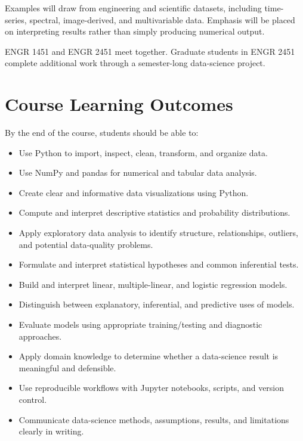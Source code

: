 \documentclass[11pt]{article}
\begin{document}
Examples will draw from engineering and scientific datasets, including time-series, spectral, image-derived, and multivariable data. Emphasis will be placed on interpreting results rather than simply producing numerical output.

ENGR 1451 and ENGR 2451 meet together. Graduate students in ENGR 2451 complete additional work through a semester-long data-science project.

\section{Course Learning Outcomes}

By the end of the course, students should be able to:

\begin{itemize}
  \item Use Python to import, inspect, clean, transform, and organize data.
  \item Use NumPy and pandas for numerical and tabular data analysis.
  \item Create clear and informative data visualizations using Python.
  \item Compute and interpret descriptive statistics and probability distributions.
  \item Apply exploratory data analysis to identify structure, relationships, outliers, and potential data-quality problems.
  \item Formulate and interpret statistical hypotheses and common inferential tests.
  \item Build and interpret linear, multiple-linear, and logistic regression models.
  \item Distinguish between explanatory, inferential, and predictive uses of models.
  \item Evaluate models using appropriate training/testing and diagnostic approaches.
  \item Apply domain knowledge to determine whether a data-science result is meaningful and defensible.
  \item Use reproducible workflows with Jupyter notebooks, scripts, and version control.
  \item Communicate data-science methods, assumptions, results, and limitations clearly in writing.
\end{itemize}

%
\end{document}
